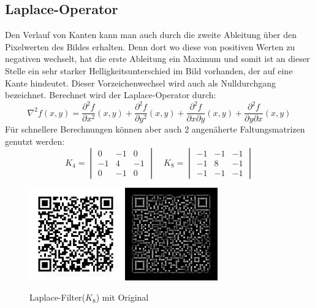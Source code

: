 \subsection*{Laplace-Operator}
Den Verlauf von Kanten kann man auch durch die zweite Ableitung über den Pixelwerten des Bildes erhalten. Denn dort wo diese von positiven Werten zu negativen wechselt, hat die erste Ableitung ein Maximum und somit ist an dieser Stelle ein sehr starker Helligkeitsunterschied im Bild vorhanden, der auf eine Kante hindeutet. Dieser Vorzeichenwechsel wird auch als Nulldurchgang bezeichnet. Berechnet wird der Laplace-Operator durch:
\begin{equation}
  \nabla^2 f(x,y) = \frac{\partial^2 f}{\partial x^2}(x,y) + \frac{\partial^2 f}{\partial y^2}(x,y) + \frac{\partial^2 f}{\partial x \partial y}(x,y) + \frac{\partial^2 f}{\partial y \partial x}(x,y)
\end{equation}
Für schnellere Berechnungen können aber auch 2 angenäherte Faltungsmatrizen genutzt werden:
\begin{equation}
  K_4 = \begin{vmatrix}
     0 & -1 &  0 \\
    -1 &  4 & -1 \\
     0 & -1 &  0
  \end{vmatrix}
  \quad
  K_8 = \begin{vmatrix}
    -1 & -1 & -1 \\
    -1 &  8 & -1 \\
    -1 & -1 & -1
  \end{vmatrix}
\end{equation}
\begin{figure}[H]
  \centering
  \includegraphics[height=4cm]{img/QR/perfect_03.jpg}
  \includegraphics[height=4cm]{img/QR/qr-laplace.jpg}
  \caption{Laplace-Filter($K_8$) mit Original}
  \label{fig:sharpgauss}
\end{figure}




